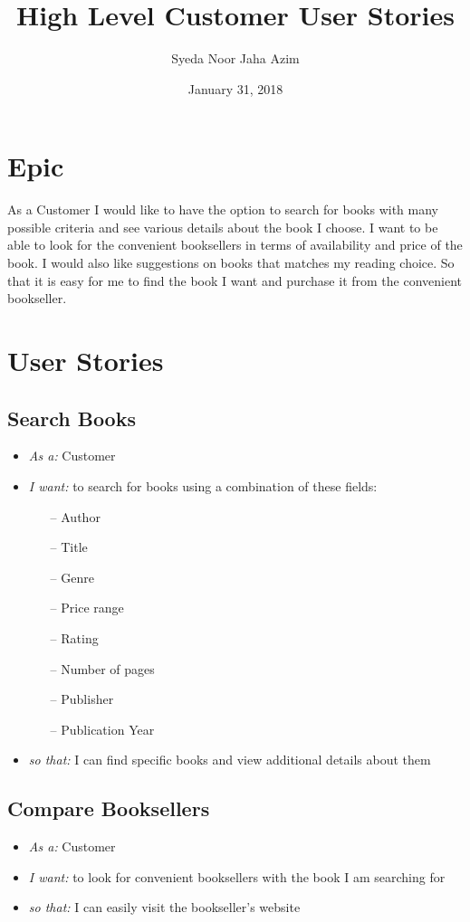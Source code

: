 \documentclass{article}
\title{High Level Customer User Stories}
\author{Syeda Noor Jaha Azim}
\date{January 31, 2018}
\begin{document}
\maketitle

\section{Epic }
As a Customer I would like to have the option to search for books with many possible criteria and see various details about the book I choose. I want to be able to look for the convenient booksellers in terms of availability and price of the book. I would also like suggestions on books that matches my reading choice. So that it is easy for me to find the book I want and purchase it from the convenient bookseller. 

\section{User Stories }

\subsection{Search Books}
\begin{itemize}
\item \emph{As a:} Customer
\item \emph{I want:} to search for books using a combination of these fields:
\begin{itemize}
    \item[--] Author
    \item[--] Title
    \item[--] Genre
    \item[--] Price range
    \item[--] Rating
    \item[--] Number of pages
    \item[--] Publisher
    \item[--] Publication Year
\end{itemize}
\item \emph{so that:} I can find specific books and view additional details about them
\end{itemize}

\subsection{Compare Booksellers}
\begin{itemize}
\item \emph{As a:} Customer
\item \emph{I want:}  to look for convenient booksellers with the book I am searching for
\item \emph{so that:}  I can easily visit the bookseller’s website
\end{itemize}
\end{document}
